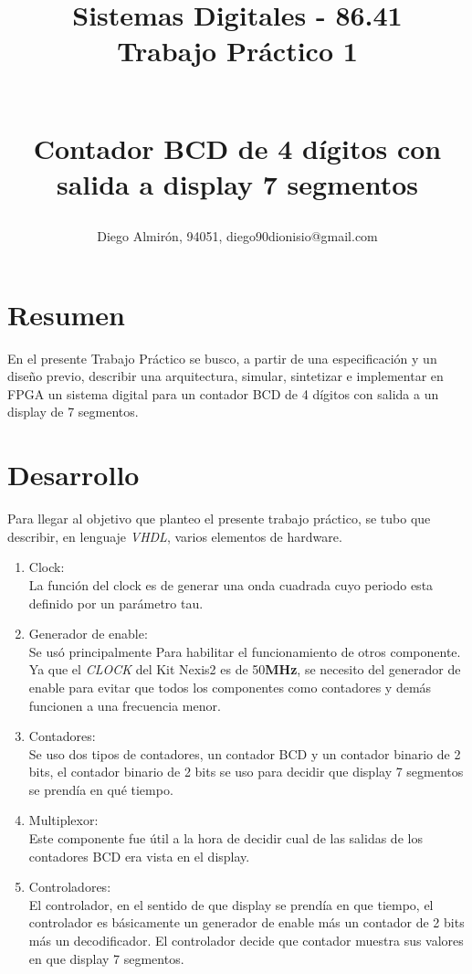 \documentclass[10pt,a4paper]{article}
\author{Diego Almirón, 94051, diego90dionisio@gmail.com}
\title{
\begin{small}
Sistemas Digitales - 86.41 \\
Trabajo Práctico 1
\end{small}
\\ Contador BCD de 4 dígitos con salida a display 7 segmentos
}
\begin{document}
\maketitle
\section*{Resumen}
En el presente Trabajo Práctico se busco, a partir de una especificación y un diseño previo, describir una arquitectura, simular, sintetizar e implementar en FPGA un sistema digital para un contador BCD de 4 dígitos con salida a un display de 7 segmentos. 
\section*{Desarrollo}
Para llegar al objetivo que planteo el presente trabajo práctico, se tubo que describir, en lenguaje \textit{VHDL}, varios elementos de hardware.
\begin{enumerate}
\item Clock: \\
La función del clock es de generar una onda cuadrada cuyo periodo esta definido por un parámetro tau.
\item Generador de enable: \\
Se usó principalmente Para habilitar el funcionamiento de otros componente. Ya que el \textit{CLOCK} del Kit Nexis2 es de 50\textbf{MHz}, se necesito del generador de enable para evitar que todos los componentes como contadores y demás funcionen a una frecuencia menor. 
\item Contadores: \\
Se uso dos tipos de contadores, un contador BCD y un contador binario de 2 bits, el contador binario de 2 bits se uso para decidir que display 7 segmentos se prendía en qué tiempo.
\item Multiplexor: \\
Este componente fue útil a la hora de decidir cual de las salidas de los contadores BCD era vista en el display.
\item Controladores: \\
El controlador, en el sentido de que display se prendía en que tiempo, el controlador es básicamente un generador de enable más un contador de 2 bits más un decodificador. El controlador decide que contador muestra sus valores en que display 7 segmentos.
\end{enumerate}
\end{document}
